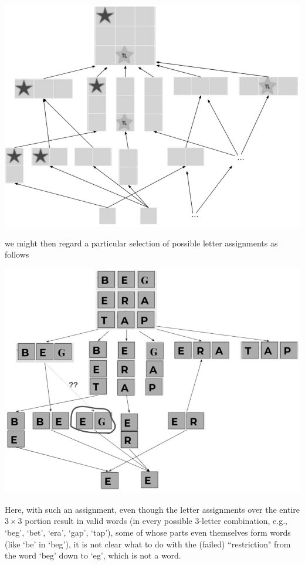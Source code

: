 \documentclass[a4paper]{book}
\theoremstyle{definition}
\theoremstyle{definition}
\theoremstyle{definition}
\theoremstyle{theorem}
\theoremstyle{definition}
\begin{document}
\begin{center}
	\includegraphics*[scale=0.23]{ScrabbleBoard.png}
\end{center}
we might then regard a particular selection of possible letter assignments as follows 
 \begin{center}
 	\includegraphics*[scale=0.23]{ScrabbleSheafAttempt.png}
 \end{center}
Here, with such an assignment, even though the letter assignments over the entire $3 \times 3$ portion result in valid words (in every possible 3-letter combination, e.g., `beg', `bet', `era', `gap', `tap'), some of whose parts even themselves form words (like `be' in `beg'), it is not clear what to do with the (failed) ``restriction" from the word `beg' down to `eg', which is not a word. 
\end{document}
